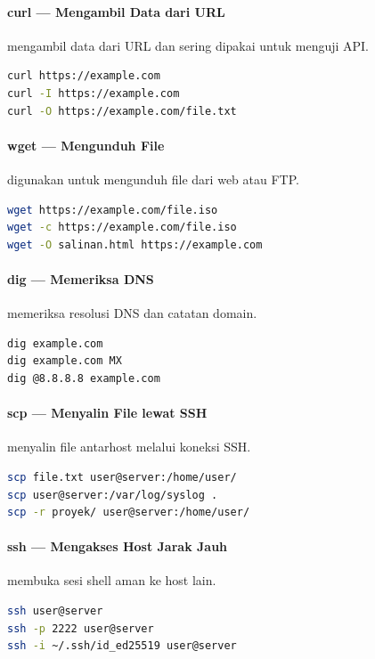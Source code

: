 \paragraph*{curl --- Mengambil Data dari URL}
 mengambil data dari URL dan sering dipakai untuk menguji API.
\begin{lstlisting}[language=bash]
curl https://example.com
curl -I https://example.com
curl -O https://example.com/file.txt
\end{lstlisting}

\paragraph*{wget --- Mengunduh File}
 digunakan untuk mengunduh file dari web atau FTP.
\begin{lstlisting}[language=bash]
wget https://example.com/file.iso
wget -c https://example.com/file.iso
wget -O salinan.html https://example.com
\end{lstlisting}

\paragraph*{dig --- Memeriksa DNS}
 memeriksa resolusi DNS dan catatan domain.
\begin{lstlisting}[language=bash]
dig example.com
dig example.com MX
dig @8.8.8.8 example.com
\end{lstlisting}

\paragraph*{scp --- Menyalin File lewat SSH}
 menyalin file antarhost melalui koneksi SSH.
\begin{lstlisting}[language=bash]
scp file.txt user@server:/home/user/
scp user@server:/var/log/syslog .
scp -r proyek/ user@server:/home/user/
\end{lstlisting}

\paragraph*{ssh --- Mengakses Host Jarak Jauh}
 membuka sesi shell aman ke host lain.
\begin{lstlisting}[language=bash]
ssh user@server
ssh -p 2222 user@server
ssh -i ~/.ssh/id_ed25519 user@server
\end{lstlisting}

